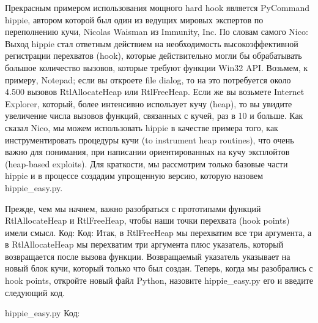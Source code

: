 \documentclass[12pt, a4paper, oneside]{book}
\begin{document}
Прекрасным примером использования мощного hard hook является PyCommand hippie, автором которой был один из ведущих мировых экспертов по переполнению кучи, Nicolas Waisman из Immunity, Inc. По словам самого Nico:
Выход hippie стал ответным действием на необходимость высокоэффективной регистрации перехватов (hook), которые действительно могли бы обрабатывать большое количество вызовов, которые требуют функции Win32 API. Возьмем, к примеру, Notepad; если вы откроете file dialog, то на это потребуется около 4.500 вызовов RtlAllocateHeap или RtlFreeHeap. Если же вы возьмете Internet Explorer, который, более интенсивно использует кучу (heap), то вы увидите увеличение числа вызовов функций, связанных с кучей, раз в 10 и больше.
Как сказал Nico, мы можем использовать hippie в качестве примера того, как инструментировать процедуры кучи (to instrument heap routines), что очень важно для понимания, при написании ориентированных на кучу эксплойтов (heap-based exploits). Для краткости, мы рассмотрим только базовые части hippie и в процессе создадим упрощенную версию, которую назовем hippie\_easy.py.

Прежде, чем мы начнем, важно разобраться с прототипами функций RtlAllocateHeap и RtlFreeHeap, чтобы наши точки перехвата (hook points) имели смысл.
Код:
Код:
Итак, в RtlFreeHeap мы перехватим все три аргумента, а в RtlAllocateHeap мы перехватим три аргумента плюс указатель, который возвращается после вызова функции. Возвращаемый указатель указывает на новый блок кучи, который только что был создан. Теперь, когда мы разобрались с hook points, откройте новый файл Python, назовите hippie\_easy.py его и введите следующий код.

hippie\_easy.py
Код:


        
\end{document}
